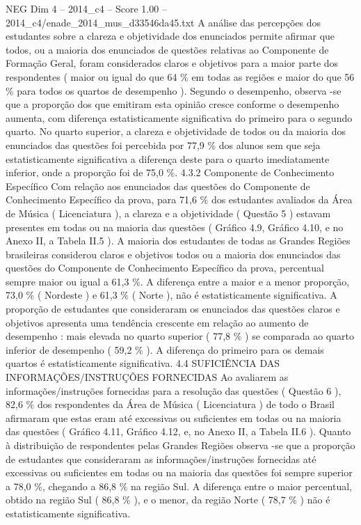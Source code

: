 \begin{textsample}{NEG Dim 4 – 2014\_c4 – Score 1.00 – 2014\_c4/enade\_2014\_mus\_d33546da45.txt}
A análise das percepções dos estudantes sobre a clareza e objetividade dos enunciados permite afirmar que todos, ou a maioria dos enunciados de questões relativas ao Componente de Formação Geral, foram considerados claros e objetivos para a maior parte dos respondentes ( maior ou igual do que 64 \% em todas as regiões e maior do que 56 \% para todos os quartos de desempenho ).
Segundo o desempenho, observa -se que a proporção dos que emitiram esta opinião cresce conforme o desempenho aumenta, com diferença estatisticamente significativa do primeiro para o segundo quarto.
No quarto superior, a clareza e objetividade de todos ou da maioria dos enunciados das questões foi percebida por 77,9 \% dos alunos sem que seja estatisticamente significativa a diferença deste para o quarto imediatamente inferior, onde a proporção foi de 75,0 \%. 4.3.2 Componente de Conhecimento Específico Com relação aos enunciados das questões do Componente de Conhecimento Específico da prova, para 71,6 \% dos estudantes avaliados da Área de Música ( Licenciatura ), a clareza e a objetividade ( Questão 5 ) estavam presentes em todas ou na maioria das questões ( Gráfico 4.9, Gráfico 4.10, e no Anexo II, a Tabela II.5 ).
A maioria dos estudantes de todas as Grandes Regiões brasileiras considerou claros e objetivos todos ou a maioria dos enunciados das questões do Componente de Conhecimento Específico da prova, percentual sempre maior ou igual a 61,3 \%.
A diferença entre a maior e a menor proporção, 73,0 \% ( Nordeste ) e 61,3 \% ( Norte ), não é estatisticamente significativa.
A proporção de estudantes que consideraram os enunciados das questões claros e objetivos apresenta uma tendência crescente em relação ao aumento de desempenho : mais elevada no quarto superior ( 77,8 \% ) se comparada ao quarto inferior de desempenho ( 59,2 \% ).
A diferença do primeiro para os demais quartos é estatisticamente significativa. 4.4 SUFICIÊNCIA DAS INFORMAÇÕES/INSTRUÇÕES FORNECIDAS Ao avaliarem as informações/instruções fornecidas para a resolução das questões ( Questão 6 ), 82,6 \% dos respondentes da Área de Música ( Licenciatura ) de todo o Brasil afirmaram que estas eram até excessivas ou suficientes em todas ou na maioria das questões ( Gráfico 4.11, Gráfico 4.12, e, no Anexo II, a Tabela II.6 ).
Quanto à distribuição de respondentes pelas Grandes Regiões observa -se que a proporção de estudantes que consideraram as informações/instruções fornecidas até excessivas ou suficientes em todas ou na maioria das questões foi sempre superior a 78,0 \%, chegando a 86,8 \% na região Sul.
A diferença entre o maior percentual, obtido na região Sul ( 86,8 \% ), e o menor, da região Norte ( 78,7 \% ) não é estatisticamente significativa.

\end{textsample}
